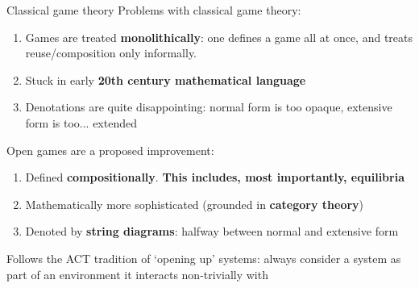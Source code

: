 \begin{frame}{Classical game theory}
	Problems with classical game theory:
	\begin{enumerate}
		\item Games are treated \textbf{monolithically}: one defines a game all at once, and treats reuse/composition only informally.
		\item Stuck in early \textbf{20th century mathematical language}
		\item Denotations are quite disappointing: normal form is too opaque, extensive form is too... extended
	\end{enumerate}

	Open games are a proposed improvement:
	\begin{enumerate}
		\item Defined \textbf{compositionally}.
		\textbf{This includes, most importantly, equilibria}
		\item Mathematically more sophisticated (grounded in \textbf{category theory})
		\item Denoted by \textbf{string diagrams}: halfway between normal and extensive form
	\end{enumerate}

	Follows the ACT tradition of `opening up' systems: always consider a system as part of an environment it interacts non-trivially with
\end{frame}
